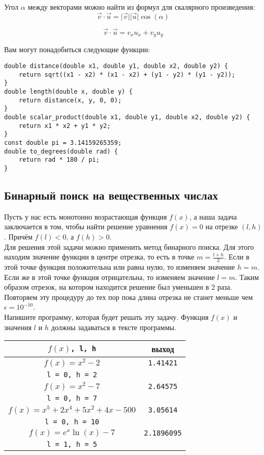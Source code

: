 \documentclass{article}
\begin{document}
Угол $\alpha$ между векторами можно найти из формул для скалярного произведения:
\begin{equation*}
\vec{v} \cdot \vec{u} = \lvert \vec{v} \rvert  \lvert \vec{u} \rvert \cos(\alpha)
\end{equation*}

\begin{equation*}
\vec{v} \cdot \vec{u} = v_x u_x + v_y u_y
\end{equation*}

Вам могут понадобиться следующие функции:
\begin{lstlisting}
double distance(double x1, double y1, double x2, double y2) {
    return sqrt((x1 - x2) * (x1 - x2) + (y1 - y2) * (y1 - y2));
}
double length(double x, double y) {
    return distance(x, y, 0, 0);
}
double scalar_product(double x1, double y1, double x2, double y2) {
    return x1 * x2 + y1 * y2;
}
const double pi = 3.14159265359;
double to_degrees(double rad) {
    return rad * 180 / pi;
}
\end{lstlisting}



\subsection{Бинарный поиск на вещественных числах} 
Пусть у нас есть монотонно возрастающая функция $f(x)$, а наша задача заключается в том, чтобы найти решение уравнения $f(x) = 0$ на отрезке $(l, h)$. Причём $f(l) < 0$, а $f(h) > 0$. \\

Для решения этой задачи можно применить метод бинарного поиска. Для этого находим значение функции в центре отрезка, то есть в точке $m = \frac{l + h}{2}$. Если в этой точке функция положительна или равна нулю, то изменяем значение $h = m$. Если же в этой точке функция отрицательна, то изменяем значение $l = m$. Таким образом отрезок, на котором находится решение был уменьшен в 2 раза. Повторяем эту процедуру до тех пор пока длина отрезка не станет меньше чем $\epsilon = 10^{-10}$.\\
Напишите программу, которая будет решать эту задачу. Функция $f(x)$ и значения $l$ и $h$ должны задаваться в тексте программы.

\renewcommand{\arraystretch}{1.3}
\begin{center}
\begin{tabular}{ c | c }
 $f(x)$\texttt{, l, h} & выход \\ \hline
 $f(x) = x^2 - 2$  & \texttt{1.41421}  \\ 
 \texttt{l = 0, h = 2} &   \\ \hline
 $f(x) = x^2 - 7$  & \texttt{2.64575}  \\ 
 \texttt{l = 0, h = 7} &   \\ \hline
 $f(x) = x^5 + 2x^4 + 5x^2 +4x - 500$  & \texttt{3.05614}  \\ 
 \texttt{l = 0, h = 10} &   \\\hline
 $f(x) = e^x \ln(x) - 7$  & \texttt{2.1896095}  \\ 
 \texttt{l = 1, h = 5} &   \\
\end{tabular}
\end{center}
\renewcommand{\arraystretch}{1}
\end{document}
